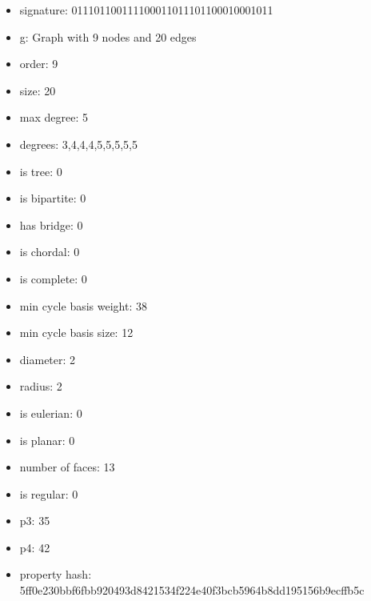 \newpage
\begin{figure}
\end{figure}
\begin{itemize}
\item signature: 011101100111100011011101100010001011
\item g: Graph with 9 nodes and 20 edges
\item order: 9
\item size: 20
\item max degree: 5
\item degrees: 3,4,4,4,5,5,5,5,5
\item is tree: 0
\item is bipartite: 0
\item has bridge: 0
\item is chordal: 0
\item is complete: 0
\item min cycle basis weight: 38
\item min cycle basis size: 12
\item diameter: 2
\item radius: 2
\item is eulerian: 0
\item is planar: 0
\item number of faces: 13
\item is regular: 0
\item p3: 35
\item p4: 42
\item property hash: 5ff0e230bbf6fbb920493d8421534f224e40f3bcb5964b8dd195156b9ecffb5c
\end{itemize}
